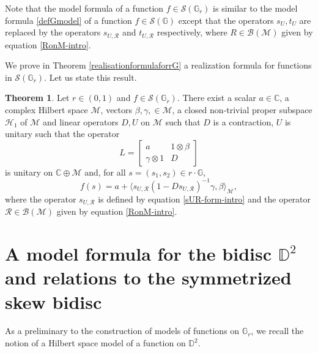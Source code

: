 \documentclass[12pt,reqno]{amsart}
\numberwithin{equation}{section}
\theoremstyle{definition}
\newtheorem{thm}[equation]{Theorem}
\begin{document}
Note that the model formula of a function $f\in\mathcal{S}(\mathbb{G}_{r})$ is similar to the model formula 
\eqref{defGmodel} of a function 
$f\in\mathcal{S}(\mathbb{G})$ except that the operators $s_U, t_U$  are replaced by the operators $s_{U,\mathcal{R}}$ and $t_{U,\mathcal{R}}$ respectively, where $R \in \mathcal{B(M)}$ given by equation \eqref{RonM-intro}. 

We  prove in Theorem \ref{realisationformulaforrG} a realization formula for functions in $\mathcal{S}(\mathbb{G}_{r})$.
Let us state this result. 
\begin{thm}\label{theoremin-intro}
Let $ r\in (0,1)$ and $f \in \mathcal{S}(\mathbb{G}_{r})$. There exist a scalar $a\in\mathbb{C}$,  a complex Hilbert space $\mathcal{M}$, vectors $\beta, \gamma, \in \mathcal{M}$, a closed non-trivial proper subspace $\mathcal{H}_{1}$ of $\mathcal{M}$ and linear operators $D,U$ on $\mathcal{M}$ such that $D$ is a contraction, $U$ is unitary such that the operator 
\begin{equation}
L=\begin{bmatrix}
    a       & 1\otimes \beta \\
    \gamma \otimes 1       & D 
\end{bmatrix}
\end{equation}
is unitary on $\mathbb{C}\oplus \mathcal{M}$ and, for all $s=(s_{1},s_{2})\in r\cdot\mathbb{G}$,
$$f(s)=a+\langle s_{U,\mathcal{R}}(1-Ds_{U,\mathcal{R}})^{-1}\gamma, \beta \rangle_{\mathcal{M}},$$
where  the operator $s_{U,\mathcal{R}}$ is defined by 
equation \eqref{sUR-form-intro} and the operator $\mathcal{R} \in\mathcal{B(M)}$ given by equation \eqref{RonM-intro}.
\end{thm}






\section{A model formula for the bidisc $\mathbb{D}^{2}$ and relations to  the symmetrized skew bidisc}\label{symmetrizedpolydiscandGr}


As a preliminary to the construction of models of functions on $\mathbb{G}_{r}$, we recall the notion of a Hilbert space model of a function on $\mathbb{D}^{2}$.
\end{document}
